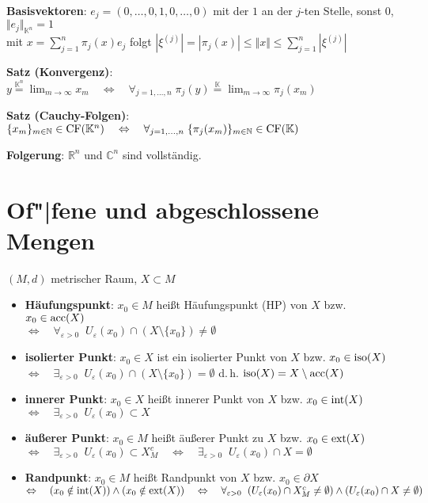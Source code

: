 \textbf{Basisvektoren}: $e_j = (0, \ldots, 0, 1, 0, \ldots, 0)$ mit der $1$
an der $j$-ten Stelle, sonst $0$, $\Vert e_j \Vert_{\mathbb{K}^n} = 1$ \\
mit $x = \sum_{j=1}^n \pi_j(x) e_j$ folgt
$|\xi^{(j)}| = |\pi_j(x)| \le \Vert x \Vert \le \sum_{j=1}^n |\xi^{(j)}|$

\textbf{Satz (Konvergenz)}:
$y \overset{\mathbb{K}^n}{=} \lim_{m \to \infty} x_m \quad\Leftrightarrow\quad
\forall_{j=1,\ldots,n}\; \pi_j(y) \overset{\mathbb{K}}{=}
\lim_{m \to \infty} \pi_j(x_m)$

\textbf{Satz (Cauchy-Folgen)}:
$\{x_m\}_{m \in \mathbb{N}} \in \operatorname{CF}(\mathbb{K}^n)
\quad\Leftrightarrow\quad
\forall_{j=1,\ldots,n}\; \{\pi_j(x_m)\}_{m \in \mathbb{N}} \in
\operatorname{CF}(\mathbb{K})$

\textbf{Folgerung}: $\mathbb{R}^n$ und $\mathbb{C}^n$ sind vollständig.

\section{%
    Of"|fene und abgeschlossene Mengen%
}

$(M,d)$ metrischer Raum, $X \subset M$

\begin{itemize}
    \item \textbf{Häufungspunkt}:
    $x_0 \in M$ heißt Häufungspunkt (HP) von $X$ bzw. $x_0 \in \operatorname{acc}(X)$ \\
    $\Leftrightarrow\quad \forall_{\varepsilon > 0}\;\;
    U_\varepsilon(x_0) \cap (X \setminus \{x_0\}) \not= \emptyset$

    \item \textbf{isolierter Punkt}:
    $x_0 \in X$ ist ein isolierter Punkt von $X$ bzw. $x_0 \in \operatorname{iso}(X)$ \\
    $\Leftrightarrow\quad \exists_{\varepsilon > 0}\;\;
    U_\varepsilon(x_0) \cap (X \setminus \{x_0\}) = \emptyset$
    \qquad d.\,h. $\operatorname{iso}(X) = X \setminus \operatorname{acc}(X)$

    \item \textbf{innerer Punkt}:
    $x_0 \in X$ heißt innerer Punkt von $X$ bzw. $x_0 \in \operatorname{int}(X)$ \\
    $\Leftrightarrow\quad
    \exists_{\varepsilon > 0}\;\; U_\varepsilon(x_0) \subset X$

    \item \textbf{äußerer Punkt}:
    $x_0 \in M$ heißt äußerer Punkt zu $X$ bzw. $x_0 \in \operatorname{ext}(X)$ \\
    $\Leftrightarrow\quad
    \exists_{\varepsilon > 0}\;\; U_\varepsilon(x_0) \subset X_M^c
    \quad\Leftrightarrow\quad
    \exists_{\varepsilon > 0}\;\; U_\varepsilon(x_0) \cap X = \emptyset$

    \item \textbf{Randpunkt}:
    $x_0 \in M$ heißt Randpunkt von $X$ bzw. $x_0 \in \partial X$ \\
    $\Leftrightarrow\quad
    (x_0 \notin \operatorname{int}(X)) \land (x_0 \notin \operatorname{ext}(X))
    \quad\Leftrightarrow\quad \forall_{\varepsilon > 0}\;\;
    (U_\varepsilon(x_0) \cap X_M^c \not= \emptyset) \land
    (U_\varepsilon(x_0) \cap X \not= \emptyset)$
\end{itemize}

